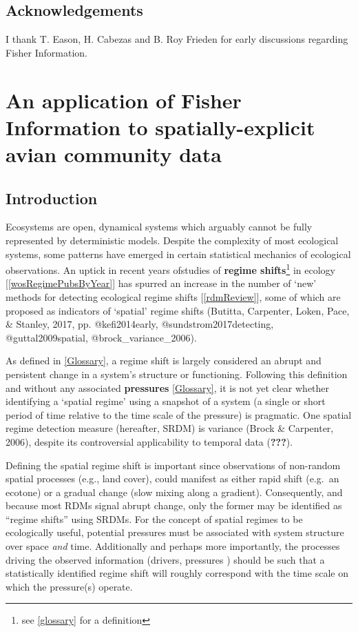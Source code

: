 \documentclass[12pt,twoside,openany]{reedthesis}
\begin{document}
\hypertarget{acknowledgements}{%
\section{Acknowledgements}\label{acknowledgements}}

I thank T. Eason, H. Cabezas and B. Roy Frieden for early discussions regarding Fisher Information.

\hypertarget{fisherSpatial}{%
\chapter{An application of Fisher Information to spatially-explicit avian community data}\label{fisherSpatial}}

\hypertarget{introduction-2}{%
\section{Introduction}\label{introduction-2}}

Ecosystems are open, dynamical systems which arguably cannot be fully represented by deterministic models. Despite the complexity of most ecological systems, some patterns have emerged in certain statistical mechanics of ecological observations. An uptick in recent years ofstudies of \textbf{regime shifts}\footnote{see \ref{glossary} for a definition} in ecology {[}\ref{wosRegimePubsByYear}{]} has spurred an increase in the number of `new' methods for detecting ecological regime shifts {[}\ref{rdmReview}{]}, some of which are proposed as indicators of `spatial' regime shifts (Butitta, Carpenter, Loken, Pace, \& Stanley, 2017, pp. @kefi2014early, @sundstrom2017detecting, @guttal2009spatial, @brock\_variance\_2006).

As defined in \ref{Glossary}, a regime shift is largely considered an abrupt and persistent change in a system's structure or functioning. Following this definition and without any associated \textbf{pressures} \ref{Glossary}, it is not yet clear whether identifying a `spatial regime' using a snapshot of a system (a single or short period of time relative to the time scale of the pressure) is pragmatic. One spatial regime detection measure (hereafter, SRDM) is variance (Brock \& Carpenter, 2006), despite its controversial applicability to temporal data ({\textbf{???}}).

Defining the spatial regime shift is important since observations of non-random spatial processes (e.g., land cover), could manifest as either rapid shift (e.g.~an ecotone) or a gradual change (slow mixing along a gradient). Consequently, and because most RDMs signal abrupt change, only the former may be identified as ``regime shifts'' using SRDMs. For the concept of spatial regimes to be ecologically useful, potential pressures must be associated with system structure over space \emph{and} time. Additionally and perhaps more importantly, the processes driving the observed information (drivers, pressures ) should be such that a statistically identified regime shift will roughly correspond with the time scale on which the pressure(s) operate.
\end{document}
